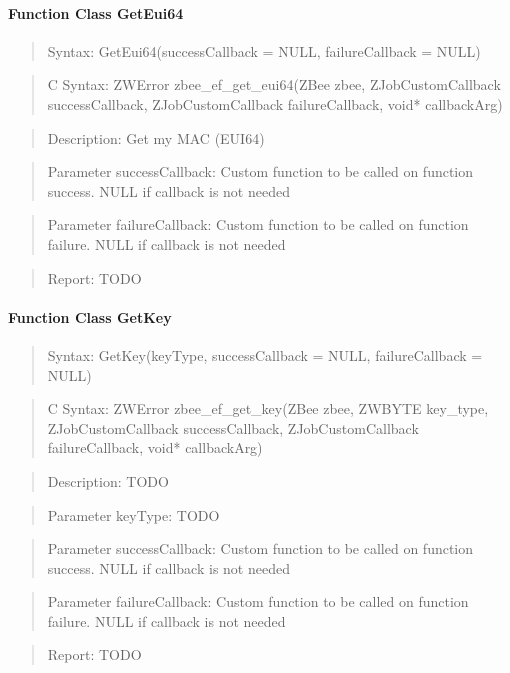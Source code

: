 \paragraph{Function Class GetEui64}
\begin{quote}Syntax: GetEui64(successCallback = NULL, failureCallback = NULL)\end{quote}
\begin{quote}C Syntax: ZWError zbee\_ef\_get\_eui64(ZBee zbee, ZJobCustomCallback successCallback, ZJobCustomCallback failureCallback, void* callbackArg)\end{quote}
\begin{quote}Description: Get my MAC (EUI64)\end{quote}
\begin{quote}Parameter successCallback: Custom function to be called on function success. NULL if callback is not needed\end{quote}
\begin{quote}Parameter failureCallback: Custom function to be called on function failure. NULL if callback is not needed\end{quote}
\begin{quote}Report: TODO\end{quote}

\paragraph{Function Class GetKey}
\begin{quote}Syntax: GetKey(keyType, successCallback = NULL, failureCallback = NULL)\end{quote}
\begin{quote}C Syntax: ZWError zbee\_ef\_get\_key(ZBee zbee, ZWBYTE key\_type, ZJobCustomCallback successCallback, ZJobCustomCallback failureCallback, void* callbackArg)\end{quote}
\begin{quote}Description: TODO\end{quote}
\begin{quote}Parameter keyType: TODO\end{quote}
\begin{quote}Parameter successCallback: Custom function to be called on function success. NULL if callback is not needed\end{quote}
\begin{quote}Parameter failureCallback: Custom function to be called on function failure. NULL if callback is not needed\end{quote}
\begin{quote}Report: TODO\end{quote}

